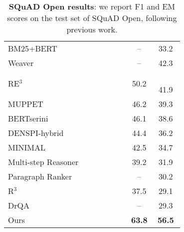\begin{table}[!t]
\begin{minipage}[t]{.5\linewidth}
{\begin{tabular}{ p{0.7\linewidth} | c c }
BM25+BERT~\citep{lee-chang-toutanova:2019:ACL2019} & --  & 33.2  \\
Weaver~\citep{raison2018weaver}& -- & 42.3 \\
RE$^3$~\citep{hu2019retrieve} & 50.2  &　41.9 \\
MUPPET~\citep{muppet2019multihop} & 46.2 & 39.3 \\
BERTserini~\citep{yang-etal-2019-end-end}& 46.1  & 38.6 \\
DENSPI-hybrid~\citep{denspi}  & 44.4  & 36.2 \\
MINIMAL~\citep{min2018efficient} &42.5 & 34.7 \\
Multi-step Reasoner~\citep{das2019multi} & 39.2   & 31.9\\
Paragraph Ranker~\citep{lee2018ranking} & -- & 30.2 \\
R$^3$~\citep{wang2018r} & 37.5 & 29.1 \\
DrQA~\citep{chen2017reading}& -- & 29.3 \\
\hline
Ours &  \bf 63.8 &  \bf 56.5  \\
  \bottomrule
\end{tabular}
    \caption{{\bf SQuAD Open results}: we report F1 and EM scores on the test set of SQuAD Open, following previous work.
    }
    \label{table:main_results_squad}
    }
\end{minipage}
\end{table}

